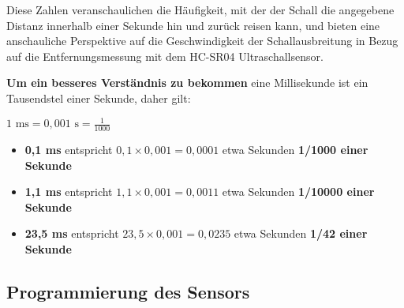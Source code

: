 \documentclass{vorlage-design-main}
\begin{document}
Diese Zahlen veranschaulichen die Häufigkeit, mit der der Schall die
angegebene Distanz innerhalb einer Sekunde hin und zurück reisen kann,
und bieten eine anschauliche Perspektive auf die Geschwindigkeit der
Schallausbreitung in Bezug auf die Entfernungsmessung mit dem HC-SR04
Ultraschallsensor.

\textbf{Um ein besseres Verständnis zu bekommen} eine Millisekunde ist
ein Tausendstel einer Sekunde, daher gilt:

$1 \text{ ms} = 0,001 \text{ s} = \frac{1}{1000}$

\begin{itemize}

\item
  \textbf{0,1 ms} entspricht $0,1 \times 0,001 = 0,0001$ etwa Sekunden
  \textbf{1/1000 einer Sekunde}
\item
  \textbf{1,1 ms} entspricht $1,1 \times 0,001 = 0,0011$ etwa Sekunden
  \textbf{1/10000 einer Sekunde}
\item
  \textbf{23,5 ms} entspricht $23,5 \times 0,001 = 0,0235$ etwa
  Sekunden \textbf{1/42 einer Sekunde}
\end{itemize}

\newpage

\hypertarget{programmierung-des-sensors}{%
\subsection{Programmierung des
Sensors}\label{programmierung-des-sensors}}
\end{document}
